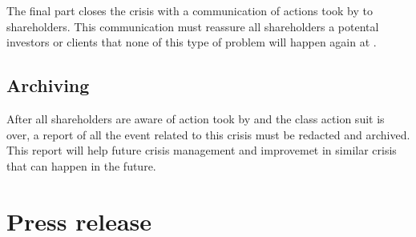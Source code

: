 The final part closes the crisis with a communication of actions took by \moldco to shareholders.
This communication must reassure all shareholders a potental investors or clients that none of this type of problem will happen again at \moldco.

\subsection{Archiving}

After all shareholders are aware of action took by \moldco and the class action suit is over, a report of all the event related to this crisis must be redacted and archived.
This report will help future crisis management and improvemet in similar crisis that can happen in the future.

\section{Press release}
\label{press-release}